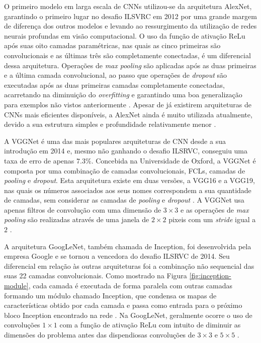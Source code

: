 O primeiro modelo em larga escala de CNNs utilizou-se da arquitetura AlexNet, garantindo o primeiro lugar no desafio ILSVRC em 2012 por uma grande margem de diferença dos outros modelos e levando ao ressurgimento da utilização de redes neurais profundas em visão computacional. O uso da função de ativação ReLu após suas oito camadas paramétricas, nas quais as cinco primeiras são convolucionais e as últimas três são completamente conectadas, é um diferencial dessa arquitetura. Operações de \emph{max pooling} são aplicadas após as duas primeiras e a última camada convolucional, ao passo que operações de \emph{dropout} são executadas após as duas primeiras camadas completamente conectadas, acarretando na diminuição do \emph{overfitting} e garantindo uma boa generalização para exemplos não vistos anteriormente \cite{khan}. Apesar de já existirem arquiteturas de CNNs mais eficientes disponíveis, a AlexNet ainda é muito utilizada atualmente, devido a sua estrutura simples e profundidade relativamente menor \cite{sewak}.

A VGGNet é uma das mais populares arquiteturas de CNN desde a sua introdução em 2014 e, mesmo não ganhando o desafio ILSRVC, conseguiu uma taxa de erro de apenas $7.3 \%$. Concebida na Universidade de Oxford, a VGGNet é composta por uma combinação de camadas convolucionais, FCLs, camadas de \emph{pooling} e \emph{dropout}. Esta arquitetura existe em duas versões, a VGG16 e a VGG19, nas quais os números associados aos seus nomes correspondem a sua quantidade de camadas, sem considerar as camadas de \emph{pooling} e \emph{dropout} \cite{khan, sewak}. A VGGNet usa apenas filtros de convolução com uma dimensão de  $3 \times 3$ e as operações de \emph{max pooling} são realizadas através de uma janela de $2 \times 2$ pixeis com um \emph{stride} igual a $2$ \cite{simonyan}.

A arquitetura GoogLeNet, também chamada de Inception, foi desenvolvida pela empresa Google e se tornou a vencedora do desafio ILSRVC de 2014. Seu diferencial em relação às outras arquiteturas foi a combinação não sequencial das suas 22 camadas convolucionais. Como mostrado na Figura \ref{fig:inception-module}, cada camada é executada de forma paralela com outras camadas formando um módulo chamado Inception, que condensa os mapas de características obtido por cada camada e passa como entrada para o próximo bloco Inception encontrado na rede \cite{khan}. Na GoogLeNet, geralmente ocorre o uso de convoluções $1 \times 1$ com a função de ativação ReLu com intuito de diminuir as dimensões do problema antes das dispendiosas convoluções de $3 \times 3$ e $5 \times 5$ \cite{sewak}.

